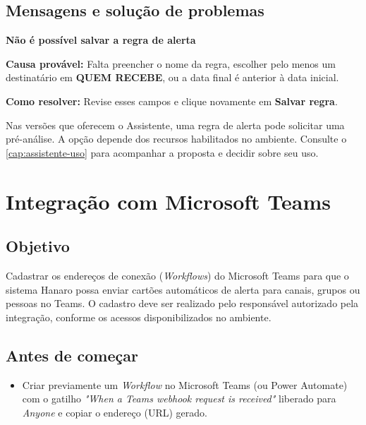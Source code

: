 \subsection*{Mensagens e solução de problemas}

\begin{remark}
\textbf{Não é possível salvar a regra de alerta}\par
\textbf{Causa provável:} Falta preencher o nome da regra, escolher pelo menos um destinatário em \textbf{QUEM RECEBE}, ou a data final é anterior à data inicial.\par
\textbf{Como resolver:} Revise esses campos e clique novamente em \textbf{Salvar regra}.
\end{remark}

\begin{remark}[info]
Nas versões que oferecem o Assistente, uma regra de alerta pode solicitar uma
pré-análise. A opção depende dos recursos habilitados no ambiente. Consulte o
\autoref{cap:assistente-uso} para acompanhar a proposta e decidir sobre seu uso.
\end{remark}

\section{Integração com Microsoft Teams}

\subsection*{Objetivo}

Cadastrar os endereços de conexão (\emph{Workflows}) do Microsoft Teams para que o sistema Hanaro possa enviar cartões automáticos de alerta para canais, grupos ou pessoas no Teams. O cadastro deve ser realizado pelo responsável autorizado pela integração, conforme os acessos disponibilizados no ambiente.\par

\subsection*{Antes de começar}

\begin{itemize}
\item Criar previamente um \emph{Workflow} no Microsoft Teams (ou Power Automate) com o gatilho \emph{"When a Teams webhook request is received"} liberado para \emph{Anyone} e copiar o endereço (URL) gerado.
\end{itemize}

